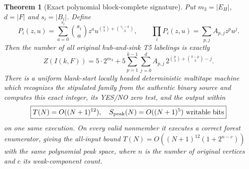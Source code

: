 \documentclass[11pt]{article}
\newtheorem{theorem}{Theorem}
\begin{document}
\begin{theorem}[Exact polynomial block-complete signature]
Put $m_3=|E_H|$, $d=|F|$ and $s_i=|B_i|$. Define
\[
 P_i(z,u)=\sum_{a=0}^{s_i}\binom{s_i}{a}z^a
     u^{\binom a3+\binom{s_i-a}3},
 \qquad
 \prod_i P_i(z,u)=\sum_{p,j}A_{p,j}z^pu^j.
\]
Then the number of \emph{all original} hub-and-sink
T5 labelings is exactly
\[
 \boxed{\displaystyle
 Z(I(k,F))=5\cdot2^{m_3}
  +5\sum_{p=1}^{k-1}\sum_{j=0}^{d}
   A_{p,j}\,
     2^{\binom p3+\binom{k-p}3-j}.}
\]
There is a uniform blank-start locally headed deterministic
multitape machine which recognizes the stipulated family
from the authentic binary source and computes this exact
integer, its YES/NO zero test, and the output within
\[
 \boxed{T(N)=O((N+1)^{12}),\quad
 S_{\rm peak}(N)=O((N+1)^5)\text{ writable bits}}
\]
on one same execution. On every valid nonmember it executes
a correct forest enumerator, giving the all-input bound
$T(N)=O((N+1)^{12}(1+2^{n-c}))$ with the same
polynomial peak space, where $n$ is the number of original
vertices and $c$ its weak-component count.
\end{theorem}
\end{document}
